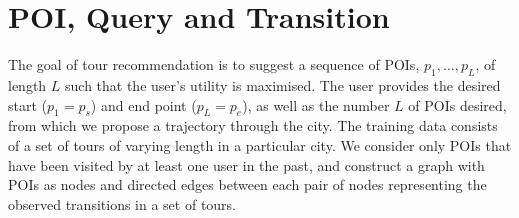 
\section{POI, Query and Transition}
\label{sec:feature}
\secmoveup


The goal of tour recommendation is to suggest a sequence of POIs, $p_1, \ldots, p_L$, of length $L$ such that the user's utility is maximised. The user provides the desired start ($p_1=p_s$) and end point ($p_L=p_e$), as well as the number $L$ of POIs desired, from which we propose a trajectory through the city.
%
%
The training data consists of a set of tours of varying length in a particular city.
We consider only POIs that have been visited by at least one user in the past, and
construct a graph with POIs as nodes and directed edges between each pair of nodes representing
the observed transitions in a set of tours.




